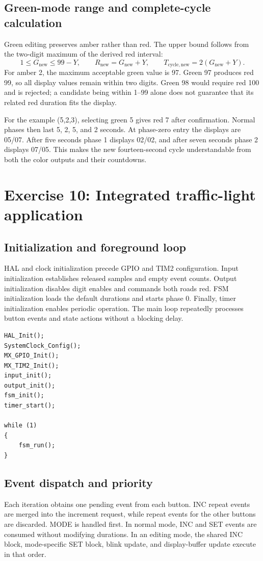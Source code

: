 \documentclass[a4paper]{article}
\newcommand{\topic}[1]{\subsection{#1}}
\begin{document}
\topic{Green-mode range and complete-cycle calculation}

Green editing preserves amber rather than red. The upper bound follows from
the two-digit maximum of the derived red interval:
\[
1\le G_{\mathrm{new}}\le99-Y,\qquad
R_{\mathrm{new}}=G_{\mathrm{new}}+Y,\qquad
T_{\mathrm{cycle,new}}=2(G_{\mathrm{new}}+Y).
\]
For amber 2, the maximum acceptable green value is 97. Green 97 produces
red 99, so all display values remain within two digits. Green 98 would
require red 100 and is rejected; a candidate being within 1--99 alone does
not guarantee that its related red duration fits the display.

For the example (5,2,3), selecting green 5 gives red 7 after confirmation.
Normal phases then last 5, 2, 5, and 2 seconds. At phase-zero entry the
displays are 05/07. After five seconds phase 1 displays 02/02, and after
seven seconds phase 2 displays 07/05. This makes the new fourteen-second
cycle understandable from both the color outputs and their countdowns.


\clearpage
\section{Exercise 10: Integrated traffic-light application}

\topic{Initialization and foreground loop}
HAL and clock initialization precede GPIO and TIM2 configuration.
Input initialization establishes released samples and empty event counts.
Output initialization disables digit enables and commands both roads red.
FSM initialization loads the default durations and starts phase 0.
Finally, timer initialization enables periodic operation. The main loop
repeatedly processes button events and state actions without a blocking delay.

\par\noindent\begin{minipage}{\linewidth}
\begin{lstlisting}[caption={Essential application initialization and main loop}]
HAL_Init();
SystemClock_Config();
MX_GPIO_Init();
MX_TIM2_Init();
input_init();
output_init();
fsm_init();
timer_start();

while (1)
{
    fsm_run();
}
\end{lstlisting}
\end{minipage}\par

\topic{Event dispatch and priority}
Each iteration obtains one pending event from each button. INC repeat events
are merged into the increment request, while repeat events for the other
buttons are discarded. MODE is handled first. In normal mode, INC and SET
events are consumed without modifying durations. In an editing mode, the
shared INC block, mode-specific SET block, blink update, and display-buffer
update execute in that order.
\end{document}
